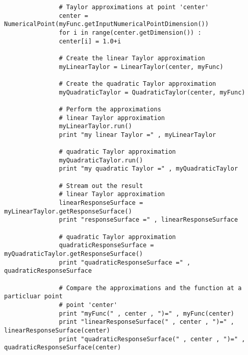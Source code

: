              \begin{lstlisting}
               # Taylor approximations at point 'center'
               center = NumericalPoint(myFunc.getInputNumericalPointDimension())
               for i in range(center.getDimension()) :
               center[i] = 1.0+i

               # Create the linear Taylor approximation
               myLinearTaylor = LinearTaylor(center, myFunc)

               # Create the quadratic Taylor approximation
               myQuadraticTaylor = QuadraticTaylor(center, myFunc)

               # Perform the approximations
               # linear Taylor approximation
               myLinearTaylor.run()
               print "my linear Taylor =" , myLinearTaylor

               # quadratic Taylor approximation
               myQuadraticTaylor.run()
               print "my quadratic Taylor =" , myQuadraticTaylor

               # Stream out the result
               # linear Taylor approximation
               linearResponseSurface = myLinearTaylor.getResponseSurface()
               print "responseSurface =" , linearResponseSurface

               # quadratic Taylor approximation
               quadraticResponseSurface = myQuadraticTaylor.getResponseSurface()
               print "quadraticResponseSurface =" , quadraticResponseSurface

               # Compare the approximations and the function at a particluar point
               # point 'center'
               print "myFunc(" , center , ")=" , myFunc(center)
               print "linearResponseSurface(" , center , ")=" , linearResponseSurface(center)
               print "quadraticResponseSurface(" , center , ")=" , quadraticResponseSurface(center)
             \end{lstlisting}
